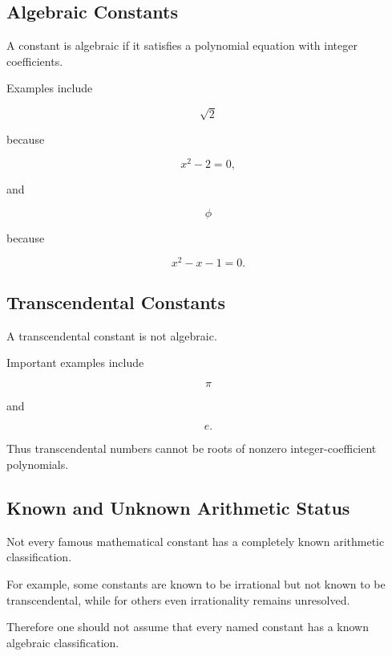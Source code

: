 \subsection{Algebraic Constants}
\label{subsec:algebraic-constants-reference}

A constant is algebraic if it satisfies a polynomial equation with integer
coefficients.

Examples include

\[
\boxed{
\sqrt2
}
\]

because

\[
x^2-2=0,
\]

and

\[
\boxed{
\phi
}
\]

because

\[
x^2-x-1=0.
\]

\subsection{Transcendental Constants}
\label{subsec:transcendental-constants-reference}

A transcendental constant is not algebraic.

Important examples include

\[
\boxed{
\pi
}
\]

and

\[
\boxed{
e.
}
\]

Thus transcendental numbers cannot be roots of nonzero integer-coefficient
polynomials.

\subsection{Known and Unknown Arithmetic Status}
\label{subsec:constant-arithmetic-status}

Not every famous mathematical constant has a completely known arithmetic
classification.

For example, some constants are known to be irrational but not known to be
transcendental, while for others even irrationality remains unresolved.

Therefore one should not assume that every named constant has a known
algebraic classification.

